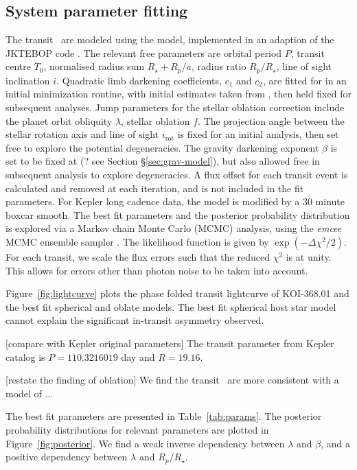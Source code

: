 \documentclass[preprint]{emulateapj}
\begin{document}
\subsection{System parameter fitting}
\label{sec:model-fitting}

The transit \lcs\ are modeled using the
\citet{Nelson1972} model, implemented in an adaption of the
JKTEBOP code \citep{Proper1981,Southworth2004}. The
relevant free parameters are orbital period $P$, transit centre $T_0$,
normalised radius sum $R_\star+R_p / a$, radius ratio $R_p/R_\star$,
line of sight inclination $i$. Quadratic limb darkening coefficients,
$c_1$ and $c_2$, are fitted for in an initial minimization routine, with 
initial estimates taken from \citet{Sing2010}, then held fixed for 
subsequent analyses. Jump parameters for the stellar oblation correction 
include the planet orbit obliquity $\lambda$, stellar oblation $f$. The 
projection angle between the stellar rotation axis and line of sight 
$i_\text{rot}$ is fixed for an initial analysis, then set free to explore 
the potential degeneracies. The gravity darkening exponent $\beta$ is set 
to be fixed at (? see Section \S \ref{sec:grav-model}), but also allowed 
free in subsequent analysis to explore degeneracies. A flux offset for each 
transit event is calculated and removed at each iteration, and is not 
included in the fit parameters. For Kepler long cadence data, the model is 
modified by a 30 minute boxcar smooth. The best fit parameters and the 
posterior probability distribution is explored via a Markov chain Monte Carlo
(MCMC) analysis, using the \emph{emcee} MCMC ensemble sampler
\citep{ForemanMackey2012}. The likelihood function is given by
$\exp(-\Delta\chi^2/2)$. For each transit, we scale the flux errors such
that the reduced $\chi^2$ is at unity. This allows for errors other
than photon noise to be taken into account.

Figure~\ref{fig:lightcurve} plots the phase folded transit lightcurve of
KOI-368.01 and the best fit spherical and oblate models. The best fit
spherical host star model cannot explain the significant in-transit
asymmetry observed. 

[compare with Kepler original parameters]
The transit parameter from Kepler catalog is 
$P = 110.3216019$ day and $R=19.16$\rearth.

[restate the finding of oblation]
We find the transit \lcs\ are more consistent with a model of ... 

The best fit parameters are presented in Table~\ref{tab:params}.
The posterior probability distributions for relevant parameters
are plotted in Figure~\ref{fig:posterior}. We find a weak inverse dependency
between $\lambda$ and $\beta$, and a positive dependency between
$\lambda$ and $R_p/R_\star$.
\end{document}
